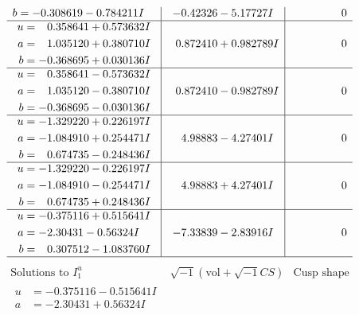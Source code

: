 \documentclass[1p]{elsarticle_modified}
\theoremstyle{definition}
\newcommand{\I}{\sqrt{-1}}
\begin{document}
$$\begin{array}{c|c|c}
\begin{aligned}
b &= -0.308619 - 0.784211 I\end{aligned}
 & -0.42326 - 5.17727 I & \phantom{-0.000000 } 0 \\ \hline\begin{aligned}
u &= \phantom{-}0.358641 + 0.573632 I \\
a &= \phantom{-}1.035120 + 0.380710 I \\
b &= -0.368695 + 0.030136 I\end{aligned}
 & \phantom{-}0.872410 + 0.982789 I & \phantom{-0.000000 } 0 \\ \hline\begin{aligned}
u &= \phantom{-}0.358641 - 0.573632 I \\
a &= \phantom{-}1.035120 - 0.380710 I \\
b &= -0.368695 - 0.030136 I\end{aligned}
 & \phantom{-}0.872410 - 0.982789 I & \phantom{-0.000000 } 0 \\ \hline\begin{aligned}
u &= -1.329220 + 0.226197 I \\
a &= -1.084910 + 0.254471 I \\
b &= \phantom{-}0.674735 - 0.248436 I\end{aligned}
 & \phantom{-}4.98883 - 4.27401 I & \phantom{-0.000000 } 0 \\ \hline\begin{aligned}
u &= -1.329220 - 0.226197 I \\
a &= -1.084910 - 0.254471 I \\
b &= \phantom{-}0.674735 + 0.248436 I\end{aligned}
 & \phantom{-}4.98883 + 4.27401 I & \phantom{-0.000000 } 0 \\ \hline\begin{aligned}
u &= -0.375116 + 0.515641 I \\
a &= -2.30431 - 0.56324 I \\
b &= \phantom{-}0.307512 - 1.083760 I\end{aligned}
 & -7.33839 - 2.83916 I & \phantom{-0.000000 } 0\\
 \hline 
 \end{array}$$\newpage$$\begin{array}{c|c|c}  
\text{Solutions to }I^u_{1}& \I (\text{vol} + \sqrt{-1}CS) & \text{Cusp shape}\\
 \hline 
\begin{aligned}
u &= -0.375116 - 0.515641 I \\
a &= -2.30431 + 0.56324 I \\

\end{aligned}
\end{array}$$
\end{document}
